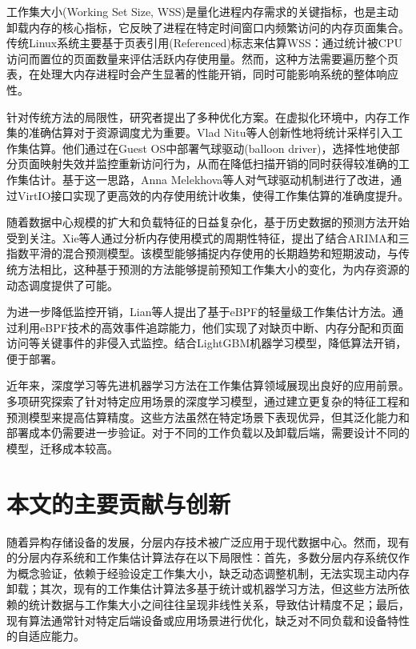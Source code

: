 工作集大小(Working Set Size, WSS)是量化进程内存需求的关键指标，也是主动卸载内存的核心指标，它反映了进程在特定时间窗口内频繁访问的内存页面集合。传统Linux系统主要基于页表引用(Referenced)标志来估算WSS：通过统计被CPU访问而置位的页面数量来评估活跃内存使用量。然而，这种方法需要遍历整个页表，在处理大内存进程时会产生显著的性能开销，同时可能影响系统的整体响应性。

针对传统方法的局限性，研究者提出了多种优化方案。在虚拟化环境中，内存工作集的准确估算对于资源调度尤为重要。Vlad Nitu等人创新性地将统计采样引入工作集估算。他们通过在Guest OS中部署气球驱动(balloon driver)，选择性地使部分页面映射失效并监控重新访问行为，从而在降低扫描开销的同时获得较准确的工作集估计。基于这一思路，Anna Melekhova等人对气球驱动机制进行了改进，通过VirtIO接口实现了更高效的内存使用统计收集，使得工作集估算的准确度提升。

随着数据中心规模的扩大和负载特征的日益复杂化，基于历史数据的预测方法开始受到关注。Xie等人通过分析内存使用模式的周期性特征，提出了结合ARIMA和三指数平滑的混合预测模型。该模型能够捕捉内存使用的长期趋势和短期波动，与传统方法相比，这种基于预测的方法能够提前预知工作集大小的变化，为内存资源的动态调度提供了可能。

为进一步降低监控开销，Lian等人提出了基于eBPF的轻量级工作集估计方法。通过利用eBPF技术的高效事件追踪能力，他们实现了对缺页中断、内存分配和页面访问等关键事件的非侵入式监控。结合LightGBM机器学习模型，降低算法开销，便于部署。

近年来，深度学习等先进机器学习方法在工作集估算领域展现出良好的应用前景。多项研究探索了针对特定应用场景的深度学习模型，通过建立更复杂的特征工程和预测模型来提高估算精度。这些方法虽然在特定场景下表现优异，但其泛化能力和部署成本仍需要进一步验证。对于不同的工作负载以及卸载后端，需要设计不同的模型，迁移成本较高。


\section{本文的主要贡献与创新}

随着异构存储设备的发展，分层内存技术被广泛应用于现代数据中心。然而，现有的分层内存系统和工作集估计算法存在以下局限性：首先，多数分层内存系统仅作为概念验证，依赖于经验设定工作集大小，缺乏动态调整机制，无法实现主动内存卸载；其次，现有的工作集估计算法多基于统计或机器学习方法，但这些方法所依赖的统计数据与工作集大小之间往往呈现非线性关系，导致估计精度不足；最后，现有算法通常针对特定后端设备或应用场景进行优化，缺乏对不同负载和设备特性的自适应能力。

